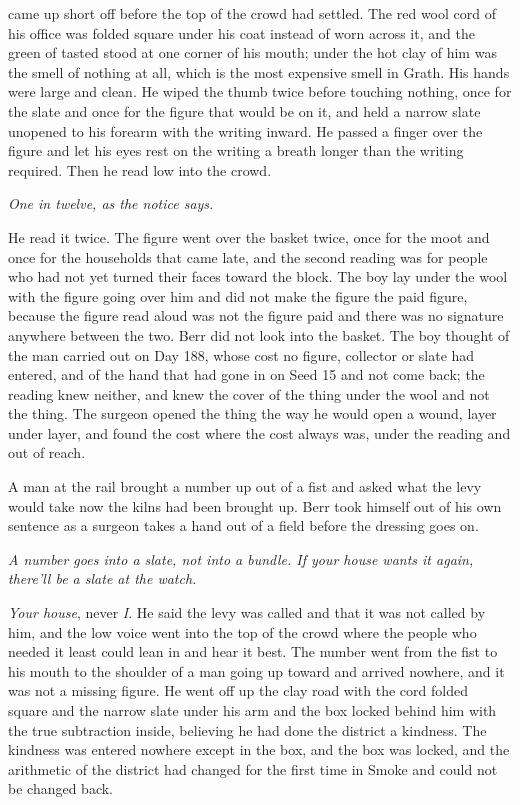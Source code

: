  came up short off  before the top of the crowd had settled. The red wool cord of his office was folded square under his coat instead of worn across it, and the green of tasted  stood at one corner of his mouth; under the hot clay of him was the smell of nothing at all, which is the most expensive smell in Grath. His hands were large and clean. He wiped the thumb twice before touching nothing, once for the slate and once for the figure that would be on it, and held a narrow slate unopened to his forearm with the writing inward. He passed a finger over the figure and let his eyes rest on the writing a breath longer than the writing required. Then he read low into the crowd.

\emph{One in twelve, as the notice says.}

He read it twice. The figure went over the basket twice, once for the moot and once for the households that came late, and the second reading was for people who had not yet turned their faces toward the block. The boy lay under the wool with the figure going over him and did not make the figure the paid figure, because the figure read aloud was not the figure paid and there was no signature anywhere between the two. Berr did not look into the basket. The boy thought of the man carried out on Day 188, whose cost no figure, collector or slate had entered, and of the hand that had gone in on Seed 15 and not come back; the reading knew neither, and knew the cover of the thing under the wool and not the thing. The surgeon opened the thing the way he would open a wound, layer under layer, and found the cost where the cost always was, under the reading and out of reach.

A man at the rail brought a number up out of a fist and asked what the levy would take now the kilns had been brought up. Berr took himself out of his own sentence as a surgeon takes a hand out of a field before the dressing goes on.

\emph{A number goes into a slate, not into a bundle. If your house wants it again, there'll be a slate at the watch.}

\emph{Your house}, never \emph{I}. He said the levy was called and that it was not called by him, and the low voice went into the top of the crowd where the people who needed it least could lean in and hear it best. The number went from the fist to his mouth to the shoulder of a man going up toward  and arrived nowhere, and it was not a missing figure. He went off up the clay road with the cord folded square and the narrow slate under his arm and the box locked behind him with the true subtraction inside, believing he had done the district a kindness. The kindness was entered nowhere except in the box, and the box was locked, and the arithmetic of the district had changed for the first time in Smoke and could not be changed back.

